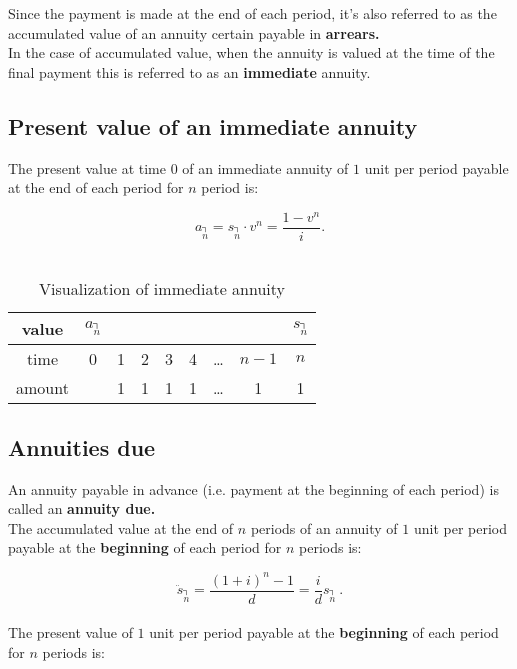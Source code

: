 \documentclass[a4paper, 11pt, twoside]{article}
\begin{document}
Since the payment is made at the end of each period, it's also referred to as the accumulated value of an annuity certain payable in \textbf{arrears.}\\

In the case of accumulated value, when the annuity is valued at the time of the final payment this is referred to as an \textbf{immediate} annuity.\\

\subsection{Present value of an immediate annuity}

The present value at time $0$ of an immediate annuity of $1$ unit per period payable at the end of each period for $n$ period is:

\[a_{\annuity{n}}=s_{\annuity{n}}\cdot v^n = \frac{1-v^n}{i}.\]\\

\begin{table}[htbp!] 
	\centering
	\begin{tabular}{|c|c|c|c|c|c|c|c|c|}
		\hline
		value & $a_{\annuity{n}}$ &  &  &  &  &  &  &  $s_{\annuity{n}}$\\
		\hline
		time & 0 & 1 & 2 & 3 & 4 & \dots & $n-1$ & $n$\\
		\hline
		amount &  & 1 & 1 & 1 & 1 & \dots & 1 & 1\\
		\hline
	\end{tabular}
	\caption{Visualization of immediate annuity}
\end{table}

\subsection{Annuities due}

An annuity payable in advance (i.e. payment at the beginning of each period) is called an \textbf{annuity due.}\\

The accumulated value at the end of $n$ periods of an annuity of $1$ unit per period payable at the \textbf{beginning} of each period for $n$ periods is:

\[\ddot{s}_{\annuity{n}}=\frac{(1+i)^n-1}{d}=\frac{i}{d}s_{\annuity{n}}\ .\]\\

The present value of $1$ unit per period payable at the \textbf{beginning} of each period for $n$ periods is:
\end{document}
